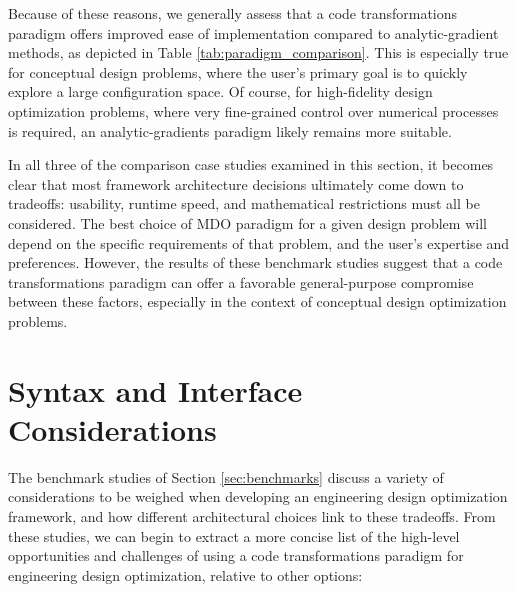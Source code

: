Because of these reasons, we generally assess that a code transformations paradigm offers improved ease of implementation compared to analytic-gradient methods, as depicted in Table \ref{tab:paradigm_comparison}. This is especially true for conceptual design problems, where the user's primary goal is to quickly explore a large configuration space. Of course, for high-fidelity design optimization problems, where very fine-grained control over numerical processes is required, an analytic-gradients paradigm likely remains more suitable.

In all three of the comparison case studies examined in this section, it becomes clear that most framework architecture decisions ultimately come down to tradeoffs: usability, runtime speed, and mathematical restrictions must all be considered. The best choice of MDO paradigm for a given design problem will depend on the specific requirements of that problem, and the user's expertise and preferences. However, the results of these benchmark studies suggest that a code transformations paradigm can offer a favorable general-purpose compromise between these factors, especially in the context of conceptual design optimization problems.


\section{Syntax and Interface Considerations}

The benchmark studies of Section \ref{sec:benchmarks} discuss a variety of considerations to be weighed when developing an engineering design optimization framework, and how different architectural choices link to these tradeoffs. From these studies, we can begin to extract a more concise list of the high-level opportunities and challenges of using a code transformations paradigm for engineering design optimization, relative to other options:

